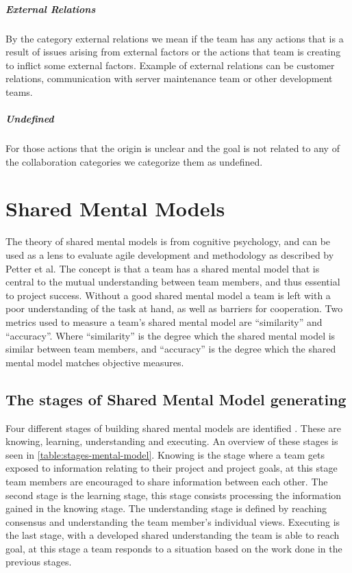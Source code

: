 \paragraph{External Relations}
By the category external relations we mean if the team has any actions that is a result of issues arising from external factors or the actions that team is creating to inflict some external factors. Example of external relations can be customer relations, communication with server maintenance team or other development teams.   
\paragraph{Undefined}
For those actions that the origin is unclear and the goal is not related to any of the collaboration categories we categorize them as undefined.

\chapter{Shared Mental Models}
\label{section:mental-models}
The theory of shared mental models is from cognitive psychology, and can be used as a lens to evaluate agile development and methodology as described by Petter et al\cite{Petter2013}. The concept is that a team has a shared mental model that is central to the mutual understanding between team members, and thus essential to project success. Without a good shared mental model a team is left with a poor understanding of the task at hand, as well as barriers for cooperation. Two metrics used to measure a team's shared mental model are ``similarity'' and ``accuracy''. Where ``similarity'' is the degree which the shared mental model is similar between team members, and ``accuracy'' is the degree which the shared mental model matches objective measures. 

\section{The stages of Shared Mental Model generating}

\label{section:mental-models-stages}
	
Four different stages of building shared mental models are identified \cite{Petter2013}. These are knowing, learning, understanding and executing. An overview of these stages is seen in  \autoref{table:stages-mental-model}. Knowing is the stage where a team gets exposed to information relating to their project and project goals, at this stage team members are encouraged to share information between each other. The second stage is the learning stage, this stage consists processing the information gained in the knowing stage. The understanding stage is defined by reaching consensus and understanding the team member's individual views. Executing is the last stage, with a developed shared understanding the team is able to reach goal, at this stage a team responds to a situation based on the work done in the previous stages.

